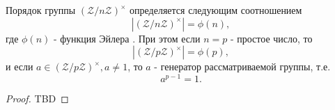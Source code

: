\begin{theorem}
Порядок группы $\left(\mathcal{Z}/n\mathcal{Z}\right)^\times$
определяется следующим соотношением
\[
\left|\left(\mathcal{Z}/n\mathcal{Z}\right)^\times\right| = \phi(n),
\]
где $\phi(n)$ - функция Эйлера . При этом если
$n=p$ - простое число, то
\[
\left|\left(\mathcal{Z}/p\mathcal{Z}\right)^\times\right| = \phi(p),
\]
и если $a \in \left(\mathcal{Z}/p\mathcal{Z}\right)^\times, a \ne 1$,
то $a$ - генератор рассматриваемой группы, т.е.
\[
a^{p-1} = 1.
\]
\begin{proof}
TBD
\end{proof}
\label{thm:add:algebra:cyclic_mult_group}
\end{theorem}
